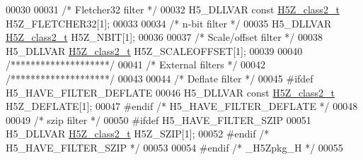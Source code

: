 \begin{DoxyCode}
00030 
00031 \textcolor{comment}{/* Fletcher32 filter */}
00032 H5\_DLLVAR \textcolor{keyword}{const} \hyperlink{struct_h5_z__class2__t}{H5Z\_class2\_t} H5Z\_FLETCHER32[1];
00033 
00034 \textcolor{comment}{/* n-bit filter */}
00035 H5\_DLLVAR \hyperlink{struct_h5_z__class2__t}{H5Z\_class2\_t} H5Z\_NBIT[1];
00036 
00037 \textcolor{comment}{/* Scale/offset filter */}
00038 H5\_DLLVAR \hyperlink{struct_h5_z__class2__t}{H5Z\_class2\_t} H5Z\_SCALEOFFSET[1];
00039 
00040 \textcolor{comment}{/********************/}
00041 \textcolor{comment}{/* External filters */}
00042 \textcolor{comment}{/********************/}
00043 
00044 \textcolor{comment}{/* Deflate filter */}
00045 \textcolor{preprocessor}{#ifdef H5\_HAVE\_FILTER\_DEFLATE}
00046 H5\_DLLVAR \textcolor{keyword}{const} \hyperlink{struct_h5_z__class2__t}{H5Z\_class2\_t} H5Z\_DEFLATE[1];
00047 \textcolor{preprocessor}{#endif }\textcolor{comment}{/* H5\_HAVE\_FILTER\_DEFLATE */}\textcolor{preprocessor}{}
00048 
00049 \textcolor{comment}{/* szip filter */}
00050 \textcolor{preprocessor}{#ifdef H5\_HAVE\_FILTER\_SZIP}
00051 H5\_DLLVAR \hyperlink{struct_h5_z__class2__t}{H5Z\_class2\_t} H5Z\_SZIP[1];
00052 \textcolor{preprocessor}{#endif }\textcolor{comment}{/* H5\_HAVE\_FILTER\_SZIP */}\textcolor{preprocessor}{}
00053 
00054 \textcolor{preprocessor}{#endif }\textcolor{comment}{/* \_H5Zpkg\_H */}\textcolor{preprocessor}{}
00055 
\end{DoxyCode}
